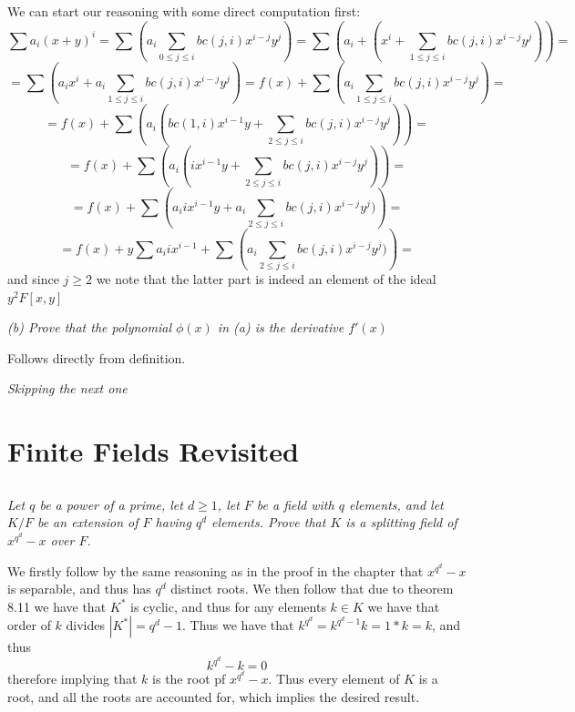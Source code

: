 \documentclass[11pt,oneside,titlepage]{book}
\begin{document}
We can start our reasoning with some direct computation first:
$$\sum{a_i (x + y)^i} = \sum{\left(a_i \sum_{0 \leq j \leq i}{bc(j, i)x^{i - j}y^j}\right)} =
\sum{\left(a_i + (x^i + \sum_{1 \leq j \leq i}{bc(j, i)x^{i - j}y^j})\right)} = $$
$$= \sum{\left(a_ix^i + a_i\sum_{1 \leq j \leq i}{bc(j, i)x^{i - j}y^j}\right)} =
f(x) + \sum{\left(a_i\sum_{1 \leq j \leq i}{bc(j, i)x^{i - j}y^j}\right)} =$$
$$ = f(x) + \sum{\left(a_i(bc(1, i)x^{i - 1}y +
    \sum_{2 \leq j \leq i}{bc(j, i)x^{i - j}y^j})\right)} = $$
$$ = f(x) + \sum{\left(a_i(i x^{i - 1}y +
    \sum_{2 \leq j \leq i}{bc(j, i)x^{i - j}y^j})\right)} = $$
$$ = f(x) + \sum{\left(a_i i x^{i - 1}y +
    a_i \sum_{2 \leq j \leq i}{bc(j, i)x^{i - j}y^j})\right)} = $$
$$ = f(x) + y \sum{a_i i x^{i - 1}} +
\sum{\left(a_i \sum_{2 \leq j \leq i}{bc(j, i)x^{i - j}y^j})\right)} = $$
and since $j \geq 2$ we note that the latter part is indeed an element of the
ideal $y^2 F[x, y]$

\textit{(b) Prove that the polynomial $\phi(x)$ in (a) is the derivative $f'(x)$}

Follows directly from definition.

\textit{Skipping the next one}

\section{Finite Fields Revisited}

\subsection{}

\textit{Let $q$ be a power of a prime, let $d \geq 1$, let $F$ be a
  field with $q$ elements, and let $K/F$ be an extension of $F$ having
  $q^d$ elements. Prove that $K$ is a splitting field of $x^{q^d} - x$
  over $F$.}


We firstly follow by the same reasoning as in the proof in the chapter
that $x^{q^d} - x$ is separable, and thus has $q^d$ distinct roots. We
then follow that due to theorem 8.11 we have that $K^*$ is cyclic, and
thus for any elements $k \in K$ we have that order of $k$ divides
$|K^*| = q^d - 1$. Thus we have that $k^{q^d} = k^{q^d - 1}k = 1 * k =
k$, and thus
$$k^{q^d} - k = 0$$
therefore implying that $k$ is the root pf $x^{q^d} - x$. Thus every
element of $K$ is a root, and all the roots are accounted for,
which implies the desired result.

\subsection{}
\end{document}
